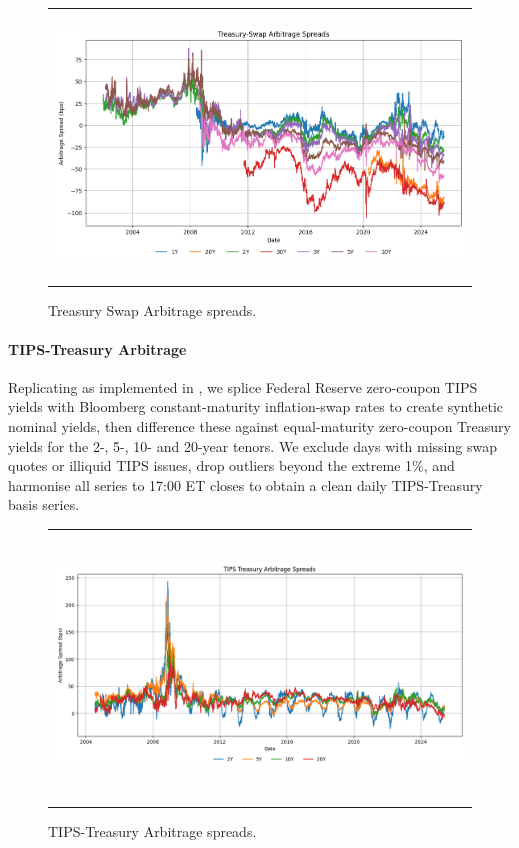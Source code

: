 \documentclass{article}
\begin{document}
\begin{figure}[h!]
  \centering
  \begin{tabular}{@{}c@{}}
    \includegraphics[width=.7\linewidth,height=200pt,width=400pt]{../docs_src/treasury_swap_arbitrage_spreads.png}
  \end{tabular}
  \caption{Treasury Swap Arbitrage spreads.}
  \label{fig:treasury_swap_arbitrage}
\end{figure}


\paragraph{TIPS-Treasury Arbitrage}
Replicating \citet{Fleckenstein2014} as implemented in \citet{Siriwardane2021}, we splice Federal Reserve zero-coupon TIPS yields with Bloomberg constant-maturity inflation-swap rates to create synthetic nominal yields, then difference these against equal-maturity zero-coupon Treasury yields for the 2-, 5-, 10- and 20-year tenors.  We exclude days with missing swap quotes or illiquid TIPS issues, drop outliers beyond the extreme 1\%, and harmonise all series to 17:00 ET closes to obtain a clean daily TIPS-Treasury basis series.

\begin{figure}[h!]
  \centering
  \begin{tabular}{@{}c@{}}
    \includegraphics[width=.7\linewidth,height=200pt,width=400pt]{../docs_src/tips_treasury_arbitrage_spreads.png}
  \end{tabular}
  \caption{TIPS-Treasury Arbitrage spreads.}
  \label{fig:tips_treasury_basis}
\end{figure}
\end{document}
